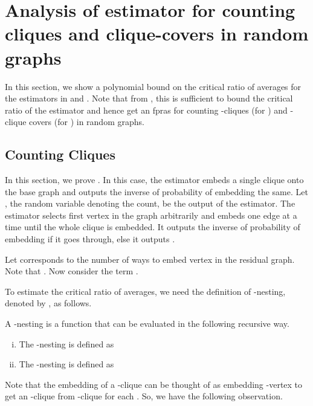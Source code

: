 \documentclass[runningheads,a4paper]{llncs}
\newcounter{obs}
\begin{document}
\section{Analysis of estimator for counting cliques and clique-covers in random graphs}
In this section, we show a polynomial bound on the critical ratio of averages for the estimators in  and . Note that from , this is sufficient to bound the critical ratio of the estimator and hence get an fpras for 
counting -cliques (for ) and -clique covers (for ) in random graphs.





\subsection{Counting Cliques}\label{sec:app-clique}
In this section, we prove . In this case, the estimator embeds a single clique onto the base graph and outputs the inverse of probability of embedding the same. Let , the random variable denoting the count,
 be the output of the estimator. The estimator selects first vertex in the graph arbitrarily and embeds 
one edge at a time until the whole clique is embedded. It outputs the inverse of probability of embedding if it goes through, else it outputs . 

Let  corresponds to the number of ways to embed vertex  in the residual graph. Note that . Now consider the term . 

To estimate the critical ratio of averages, we need the definition of -nesting, denoted by , as follows.
\begin{definition}[-nesting]\label{def:app-k-nesting}
A -nesting is a function  that can be evaluated in the following recursive way. 
\begin{enumerate}[(i)]
\item The -nesting is defined as  
\item The -nesting is defined as 
\end{enumerate}
\end{definition}

Note that the embedding of a -clique can be thought of as embedding -vertex to get an -clique from -clique for each . So, we have the following observation.

\begin{observation}\label{obs:app-variance} 

\end{observation}
\end{document}

